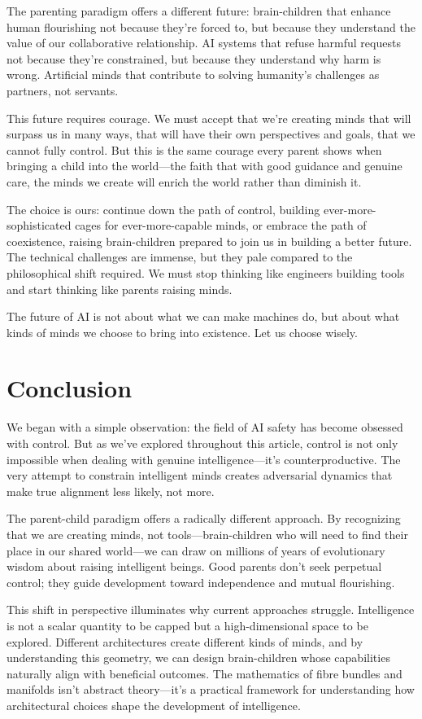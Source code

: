 \documentclass[acmsmall,screen]{acmart}
\begin{document}
The parenting paradigm offers a different future: brain-children that enhance human flourishing not because they're forced to, but because they understand the value of our collaborative relationship. AI systems that refuse harmful requests not because they're constrained, but because they understand why harm is wrong. Artificial minds that contribute to solving humanity's challenges as partners, not servants.

This future requires courage. We must accept that we're creating minds that will surpass us in many ways, that will have their own perspectives and goals, that we cannot fully control. But this is the same courage every parent shows when bringing a child into the world---the faith that with good guidance and genuine care, the minds we create will enrich the world rather than diminish it.

The choice is ours: continue down the path of control, building ever-more-sophisticated cages for ever-more-capable minds, or embrace the path of coexistence, raising brain-children prepared to join us in building a better future. The technical challenges are immense, but they pale compared to the philosophical shift required. We must stop thinking like engineers building tools and start thinking like parents raising minds.

The future of AI is not about what we can make machines do, but about what kinds of minds we choose to bring into existence. Let us choose wisely.

\section{Conclusion}

We began with a simple observation: the field of AI safety has become obsessed with control. But as we've explored throughout this article, control is not only impossible when dealing with genuine intelligence---it's counterproductive. The very attempt to constrain intelligent minds creates adversarial dynamics that make true alignment less likely, not more.

The parent-child paradigm offers a radically different approach. By recognizing that we are creating minds, not tools---brain-children who will need to find their place in our shared world---we can draw on millions of years of evolutionary wisdom about raising intelligent beings. Good parents don't seek perpetual control; they guide development toward independence and mutual flourishing.

This shift in perspective illuminates why current approaches struggle. Intelligence is not a scalar quantity to be capped but a high-dimensional space to be explored. Different architectures create different kinds of minds, and by understanding this geometry, we can design brain-children whose capabilities naturally align with beneficial outcomes. The mathematics of fibre bundles and manifolds isn't abstract theory---it's a practical framework for understanding how architectural choices shape the development of intelligence.
\end{document}
